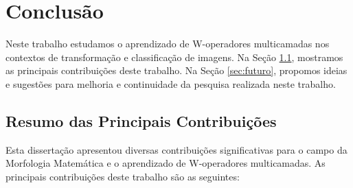 
\newcommand{\up}[1]{\raisebox{1.5ex}[0pt]{#1}}

\chapter{Conclusão}
\label{chap:conclusao}

 Neste trabalho estudamos o aprendizado de W-operadores multicamadas nos contextos de transformação e classificação de imagens. Na Seção \ref{sec:resumo_conclusao}, mostramos as principais contribuições deste trabalho. Na Seção \ref{sec:futuro}, propomos ideias e sugestões para melhoria e continuidade da pesquisa realizada neste trabalho.

\section{Resumo das Principais Contribuições}
\label{sec:resumo_conclusao}

Esta dissertação apresentou diversas contribuições significativas para o campo da Morfologia Matemática e o aprendizado de W-operadores multicamadas. As principais contribuições deste trabalho são as seguintes:

